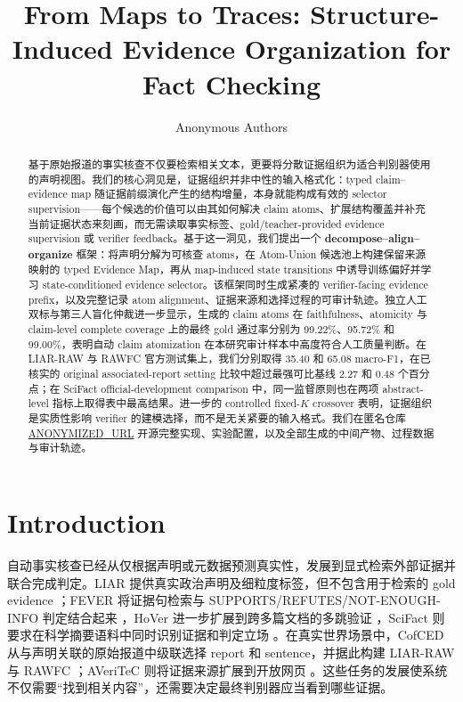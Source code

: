 \documentclass[letterpaper]{article}
\title{From Maps to Traces: Structure-Induced Evidence Organization for Fact Checking}
\author{Anonymous Authors}
\begin{document}
\maketitle

\begin{abstract}
基于原始报道的事实核查不仅要检索相关文本，更要将分散证据组织为适合判别器使用的声明视图。我们的核心洞见是，证据组织并非中性的输入格式化：typed claim--evidence map 随证据前缀演化产生的结构增量，本身就能构成有效的 selector supervision——每个候选的价值可以由其如何解决 claim atoms、扩展结构覆盖并补充当前证据状态来刻画，而无需读取事实标签、gold/teacher-provided evidence supervision 或 verifier feedback。基于这一洞见，我们提出一个 \textbf{decompose--align--organize} 框架：将声明分解为可核查 atoms，在 Atom-Union 候选池上构建保留来源映射的 typed Evidence Map，再从 map-induced state transitions 中诱导训练偏好并学习 state-conditioned evidence selector。该框架同时生成紧凑的 verifier-facing evidence prefix，以及完整记录 atom alignment、证据来源和选择过程的可审计轨迹。独立人工双标与第三人盲化仲裁进一步显示，生成的 claim atoms 在 faithfulness、atomicity 与 claim-level complete coverage 上的最终 gold 通过率分别为 99.22\%、95.72\% 和 99.00\%，表明自动 claim atomization 在本研究审计样本中高度符合人工质量判断。在 LIAR-RAW 与 RAWFC 官方测试集上，我们分别取得 35.40 和 65.08 macro-F1，在已核实的 original associated-report setting 比较中超过最强可比基线 2.27 和 0.48 个百分点；在 SciFact official-development comparison 中，同一监督原则也在两项 abstract-level 指标上取得表中最高结果。进一步的 controlled fixed-$K$ crossover 表明，证据组织是实质性影响 verifier 的建模选择，而不是无关紧要的输入格式。我们在匿名仓库 \url{ANONYMIZED_URL} 开源完整实现、实验配置，以及全部生成的中间产物、过程数据与审计轨迹。

\end{abstract}

\section{Introduction}

自动事实核查已经从仅根据声明或元数据预测真实性，发展到显式检索外部证据并联合完成判定。LIAR 提供真实政治声明及细粒度标签，但不包含用于检索的 gold evidence \citep{Wang2017LIAR}；FEVER 将证据句检索与 SUPPORTS/REFUTES/NOT-ENOUGH-INFO 判定结合起来 \citep{Thorne2018FEVER}，HoVer 进一步扩展到跨多篇文档的多跳验证 \citep{Jiang2020HoVer}，SciFact 则要求在科学摘要语料中同时识别证据和判定立场 \citep{Wadden2020SciFact}。在真实世界场景中，CofCED 从与声明关联的原始报道中级联选择 report 和 sentence，并据此构建 LIAR-RAW 与 RAWFC \citep{Yang2022CofCED}；AVeriTeC 则将证据来源扩展到开放网页 \citep{Schlichtkrull2023AVeriTeC}。这些任务的发展使系统不仅需要“找到相关内容”，还需要决定最终判别器应当看到哪些证据。
\end{document}
